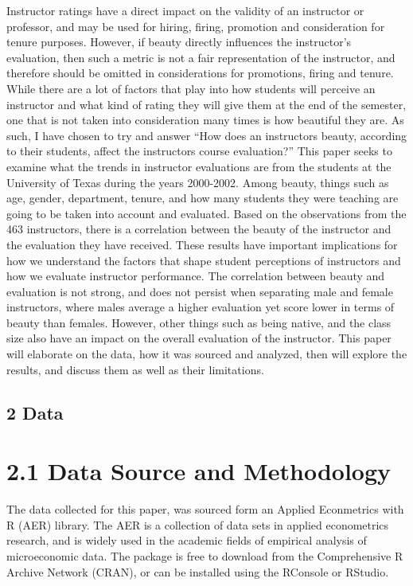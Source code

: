 \documentclass[
  letterpaper,
  DIV=11,
  numbers=noendperiod]{scrartcl}
\begin{document}
Instructor ratings have a direct impact on the validity of an instructor
or professor, and may be used for hiring, firing, promotion and
consideration for tenure purposes. However, if beauty directly
influences the instructor's evaluation, then such a metric is not a fair
representation of the instructor, and therefore should be omitted in
considerations for promotions, firing and tenure. While there are a lot
of factors that play into how students will perceive an instructor and
what kind of rating they will give them at the end of the semester, one
that is not taken into consideration many times is how beautiful they
are. As such, I have chosen to try and answer ``How does an instructors
beauty, according to their students, affect the instructors course
evaluation?'' This paper seeks to examine what the trends in instructor
evaluations are from the students at the University of Texas during the
years 2000-2002. Among beauty, things such as age, gender, department,
tenure, and how many students they were teaching are going to be taken
into account and evaluated. Based on the observations from the 463
instructors, there is a correlation between the beauty of the instructor
and the evaluation they have received. These results have important
implications for how we understand the factors that shape student
perceptions of instructors and how we evaluate instructor performance.
The correlation between beauty and evaluation is not strong, and does
not persist when separating male and female instructors, where males
average a higher evaluation yet score lower in terms of beauty than
females. However, other things such as being native, and the class size
also have an impact on the overall evaluation of the instructor. This
paper will elaborate on the data, how it was sourced and analyzed, then
will explore the results, and discuss them as well as their limitations.

\hypertarget{data}{%
\subsection{2 Data}\label{data}}

\hypertarget{data-source-and-methodology}{%
\section{2.1 Data Source and
Methodology}\label{data-source-and-methodology}}

The data collected for this paper, was sourced form an Applied
Econmetrics with R (AER) library. The AER is a collection of data sets
in applied econometrics research, and is widely used in the academic
fields of empirical analysis of microeconomic data. The package is free
to download from the Comprehensive R Archive Network (CRAN), or can be
installed using the RConsole or RStudio.
\end{document}
